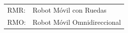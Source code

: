 \begin{tabular}{ll}
  \hline
	RMR:	& Robot Móvil con Ruedas  			\\
	RMO:	& Robot Móvil Omnidireccional		\\
  \hline
\end{tabular}

\newpage
\empty
\thispagestyle{empty}
\tableofcontents

\newpage
\empty
\thispagestyle{empty}
\listoffigures

\newpage
\empty
\thispagestyle{empty}
\listoftables
\newpage
\empty

